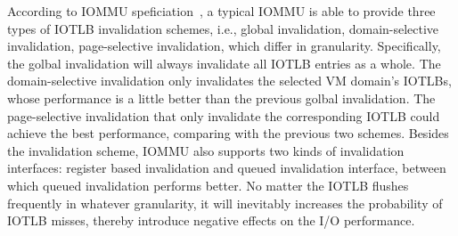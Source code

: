 According to IOMMU speficiation~\cite{intelvt}, a typical IOMMU is able to provide three types of IOTLB invalidation schemes, i.e., global invalidation, domain-selective invalidation, page-selective invalidation, which differ in granularity. 
Specifically, the golbal invalidation will always invalidate all IOTLB entries as a whole.
The domain-selective invalidation only invalidates the selected VM domain's IOTLBs, whose performance is a little better than the previous golbal invalidation.
The page-selective invalidation that only invalidate the corresponding IOTLB could achieve the best performance, comparing with the previous two schemes.
Besides the invalidation scheme, IOMMU also supports two kinds of invalidation interfaces: register based invalidation and queued invalidation interface, between which queued invalidation performs better.
No matter the IOTLB flushes frequently in whatever granularity, it will inevitably increases the probability of IOTLB misses, thereby introduce negative effects on the I/O performance. 
